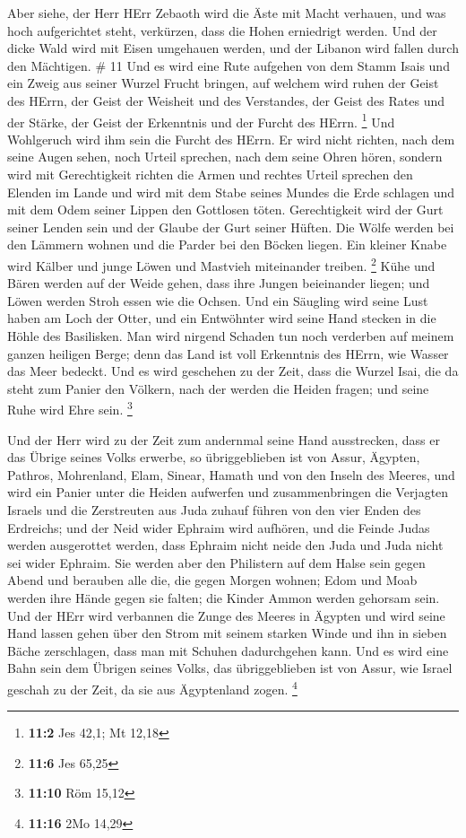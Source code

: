  Aber siehe, der Herr HErr Zebaoth wird die Äste mit Macht
verhauen, und was hoch aufgerichtet steht, verkürzen, dass die Hohen
erniedrigt werden.  Und der dicke Wald wird mit Eisen
umgehauen werden, und der Libanon wird fallen durch den Mächtigen. \# 11
 Und es wird eine Rute aufgehen von dem Stamm Isais und ein
Zweig aus seiner Wurzel Frucht bringen,  auf welchem wird
ruhen der Geist des HErrn, der Geist der Weisheit und des Verstandes,
der Geist des Rates und der Stärke, der Geist der Erkenntnis und der
Furcht des HErrn. \footnote{\textbf{11:2} Jes 42,1; Mt 12,18}
 Und Wohlgeruch wird ihm sein die Furcht des HErrn. Er wird
nicht richten, nach dem seine Augen sehen, noch Urteil sprechen, nach
dem seine Ohren hören,  sondern wird mit Gerechtigkeit
richten die Armen und rechtes Urteil sprechen den Elenden im Lande und
wird mit dem Stabe seines Mundes die Erde schlagen und mit dem Odem
seiner Lippen den Gottlosen töten.  Gerechtigkeit wird der
Gurt seiner Lenden sein und der Glaube der Gurt seiner Hüften.
 Die Wölfe werden bei den Lämmern wohnen und die Parder bei
den Böcken liegen. Ein kleiner Knabe wird Kälber und junge Löwen und
Mastvieh miteinander treiben. \footnote{\textbf{11:6} Jes 65,25}
 Kühe und Bären werden auf der Weide gehen, dass ihre Jungen
beieinander liegen; und Löwen werden Stroh essen wie die Ochsen.
 Und ein Säugling wird seine Lust haben am Loch der Otter,
und ein Entwöhnter wird seine Hand stecken in die Höhle des Basilisken.
 Man wird nirgend Schaden tun noch verderben auf meinem
ganzen heiligen Berge; denn das Land ist voll Erkenntnis des HErrn, wie
Wasser das Meer bedeckt.  Und es wird geschehen zu der
Zeit, dass die Wurzel Isai, die da steht zum Panier den Völkern, nach
der werden die Heiden fragen; und seine Ruhe wird Ehre sein. \footnote{\textbf{11:10}
  Röm 15,12}

 Und der Herr wird zu der Zeit zum andernmal seine Hand
ausstrecken, dass er das Übrige seines Volks erwerbe, so übriggeblieben
ist von Assur, Ägypten, Pathros, Mohrenland, Elam, Sinear, Hamath und
von den Inseln des Meeres,  und wird ein Panier unter die
Heiden aufwerfen und zusammenbringen die Verjagten Israels und die
Zerstreuten aus Juda zuhauf führen von den vier Enden des Erdreichs;
 und der Neid wider Ephraim wird aufhören, und die Feinde
Judas werden ausgerottet werden, dass Ephraim nicht neide den Juda und
Juda nicht sei wider Ephraim.  Sie werden aber den
Philistern auf dem Halse sein gegen Abend und berauben alle die, die
gegen Morgen wohnen; Edom und Moab werden ihre Hände gegen sie falten;
die Kinder Ammon werden gehorsam sein.  Und der HErr wird
verbannen die Zunge des Meeres in Ägypten und wird seine Hand lassen
gehen über den Strom mit seinem starken Winde und ihn in sieben Bäche
zerschlagen, dass man mit Schuhen dadurchgehen kann.  Und
es wird eine Bahn sein dem Übrigen seines Volks, das übriggeblieben ist
von Assur, wie Israel geschah zu der Zeit, da sie aus Ägyptenland zogen.
\footnote{\textbf{11:16} 2Mo 14,29}

